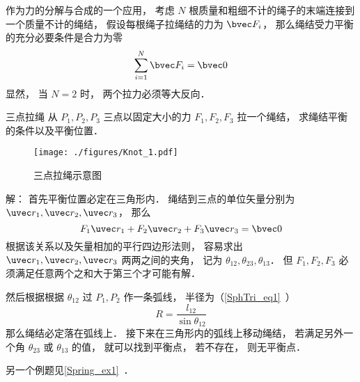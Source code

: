 

作为力的分解与合成的一个应用， 考虑 $N$ 根质量和粗细不计的绳子的末端连接到一个质量不计的绳结， 假设每根绳子拉绳结的力为 $\bvec F_i$， 那么绳结受力平衡的充分必要条件是合力为零
\begin{equation}
\sum_{i=1}^N \bvec F_i = \bvec 0
\end{equation}
显然， 当 $N = 2$ 时， 两个拉力必须等大反向．

\begin{example}{三点拉绳}
从 $P_1,P_2,P_3$ 三点以固定大小的力 $F_1, F_2, F_3$ 拉一个绳结， 求绳结平衡的条件以及平衡位置．
\begin{figure}[ht]
\centering
\texttt{[image: ./figures/Knot\_1.pdf]}
\caption{三点拉绳示意图} \label{Knot_fig1}
\end{figure}

解： 首先平衡位置必定在三角形内． 绳结到三点的单位矢量分别为 $\uvec r_1, \uvec r_2, \uvec r_3$， 那么
\begin{equation}
F_1 \uvec r_1 + F_2 \uvec r_2 + F_3 \uvec r_3 = \bvec 0
\end{equation}
根据该关系以及矢量相加的平行四边形法则， 容易求出 $\uvec r_1, \uvec r_2, \uvec r_3$ 两两之间的夹角， 记为 $\theta_{12}, \theta_{23}, \theta_{13}$． 但 $F_1, F_2, F_3$ 必须满足任意两个之和大于第三个才可能有解．

然后根据根据 $\theta_{12}$ 过 $P_1, P_2$ 作一条弧线， 半径为（\autoref{SphTri_eq1}~）
\begin{equation}
R = \frac{l_{12}}{\sin\theta_{12}}
\end{equation}
那么绳结必定落在弧线上． 接下来在三角形内的弧线上移动绳结， 若满足另外一个角 $\theta_{23}$ 或 $\theta_{13}$ 的值， 就可以找到平衡点， 若不存在， 则无平衡点．
\end{example}

另一个例题见\autoref{Spring_ex1}~．
